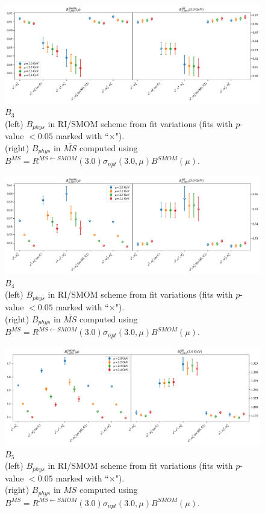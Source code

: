 \documentclass[12pt]{extarticle}
\begin{document}
\begin{figure}
\centering
\includegraphics[page=1, width=1.1\textwidth]{SSmPP/NPR/fit_summary.pdf}
\caption{$B_{3}$\\(left) $B_{phys}$ in RI/SMOM scheme from fit variations (fits with $p$-value $<0.05$ marked with ``$\times$"). \\(right) $B_{phys}$ in $\overline{MS}$ computed using $B^{\overline{MS}} = R^{\overline{MS}\leftarrow SMOM}(3.0)\sigma_{npt}(3.0,\mu) B^{SMOM}(\mu)$.}
\end{figure}
\clearpage
\begin{figure}
\centering
\includegraphics[page=1, width=1.1\textwidth]{SSpPP/NPR/fit_summary.pdf}
\caption{$B_{4}$\\(left) $B_{phys}$ in RI/SMOM scheme from fit variations (fits with $p$-value $<0.05$ marked with ``$\times$"). \\(right) $B_{phys}$ in $\overline{MS}$ computed using $B^{\overline{MS}} = R^{\overline{MS}\leftarrow SMOM}(3.0)\sigma_{npt}(3.0,\mu) B^{SMOM}(\mu)$.}
\end{figure}
\clearpage
\begin{figure}
\centering
\includegraphics[page=1, width=1.1\textwidth]{TT/NPR/fit_summary.pdf}
\caption{$B_{5}$\\(left) $B_{phys}$ in RI/SMOM scheme from fit variations (fits with $p$-value $<0.05$ marked with ``$\times$"). \\(right) $B_{phys}$ in $\overline{MS}$ computed using $B^{\overline{MS}} = R^{\overline{MS}\leftarrow SMOM}(3.0)\sigma_{npt}(3.0,\mu) B^{SMOM}(\mu)$.}
\end{figure}
\clearpage
\end{document}
